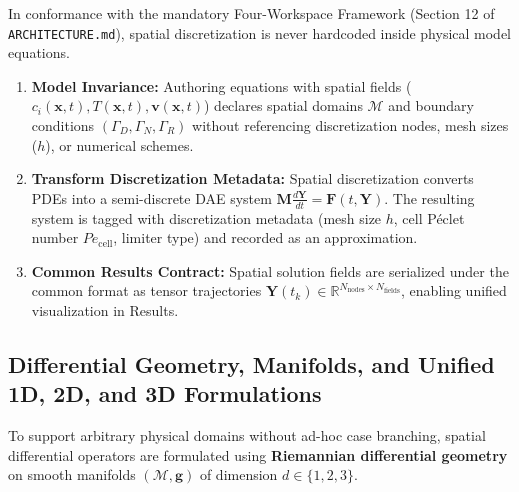 \documentclass[11pt,a4paper]{article}
\begin{document}
In conformance with the mandatory Four-Workspace Framework (Section 12 of \texttt{ARCHITECTURE.md}), spatial discretization is never hardcoded inside physical model equations.
\begin{enumerate}[leftmargin=*]
    \item \textbf{Model Invariance:} Authoring equations with spatial fields ($c_i(\mathbf{x}, t), T(\mathbf{x}, t), \mathbf{v}(\mathbf{x}, t)$) declares spatial domains $\mathcal{M}$ and boundary conditions $(\Gamma_D, \Gamma_N, \Gamma_R)$ without referencing discretization nodes, mesh sizes ($h$), or numerical schemes.
    \item \textbf{Transform Discretization Metadata:} Spatial discretization converts PDEs into a semi-discrete DAE system $\mathbf{M} \frac{d\mathbf{Y}}{dt} = \mathbf{F}(t, \mathbf{Y})$. The resulting system is tagged with discretization metadata (mesh size $h$, cell P\'eclet number $Pe_{\text{cell}}$, limiter type) and recorded as an approximation.
    \item \textbf{Common Results Contract:} Spatial solution fields are serialized under the common format as tensor trajectories $\mathbf{Y}(t_k) \in \mathbb{R}^{N_{\text{nodes}} \times N_{\text{fields}}}$, enabling unified visualization in Results.
\end{enumerate}

\subsection{Differential Geometry, Manifolds, and Unified 1D, 2D, and 3D Formulations}

To support arbitrary physical domains without ad-hoc case branching, spatial differential operators are formulated using \textbf{Riemannian differential geometry} on smooth manifolds $(\mathcal{M}, \mathbf{g})$ of dimension $d \in \{1, 2, 3\}$.
\end{document}
